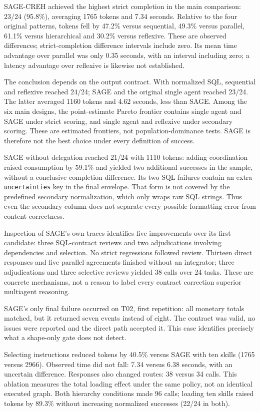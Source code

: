 SAGE-CREH achieved the highest strict completion in the main comparison:
23/24 (95.8\%), averaging 1765 tokens and 7.34 seconds. Relative to the four original
patterns, tokens fell by 47.2\% versus sequential, 49.3\% versus parallel, 61.1\%
versus hierarchical and 30.2\% versus reflexive. These are observed differences;
strict-completion difference intervals include zero. Its mean time advantage
over parallel was only 0.35 seconds, with an interval including zero; a latency
advantage over reflexive is likewise not established.

The conclusion depends on the output contract. With normalized SQL, sequential
and reflexive reached 24/24; SAGE and the original single agent reached 23/24.
The latter averaged 1160 tokens and 4.62 seconds, less than SAGE. Among the six
main designs, the point-estimate Pareto frontier contains single agent and SAGE
under strict scoring, and single agent and reflexive under secondary scoring.
These are estimated frontiers, not population-dominance tests. SAGE is therefore
not the best choice under every definition of success.

SAGE without delegation reached 21/24 with 1110 tokens: adding coordination raised
consumption by 59.1\% and yielded two additional successes in the sample, without
a conclusive completion difference. Its two SQL failures contain an extra
\texttt{uncertainties} key in the final envelope. That form is not covered by the
predefined secondary normalization, which only wraps raw SQL strings. Thus even
the secondary column does not separate every possible formatting error from
content correctness.

Inspection of SAGE's own traces identifies five improvements over its first
candidate: three SQL-contract reviews and two adjudications involving dependencies
and selection. No strict regressions followed review. Thirteen direct responses
and five parallel agreements finished without an integrator; three adjudications
and three selective reviews yielded 38 calls over 24 tasks. These are concrete
mechanisms, not a reason to label every contract correction superior multiagent
reasoning.

SAGE's only final failure occurred on T02, first repetition: all monetary totals
matched, but it returned seven events instead of eight. The contract was valid,
no issues were reported and the direct path accepted it. This case identifies
precisely what a shape-only gate does not detect.

Selecting instructions reduced tokens by 40.5\% versus SAGE with ten skills
(1765 versus 2966). Observed time did not fall: 7.34 versus 6.38 seconds, with an
uncertain difference. Responses also changed routes: 38 versus 34 calls. This
ablation measures the total loading effect under the same policy, not an identical
executed graph. Both hierarchy conditions made 96 calls; loading ten skills raised
tokens by 89.3\% without increasing normalized successes (22/24 in both).

